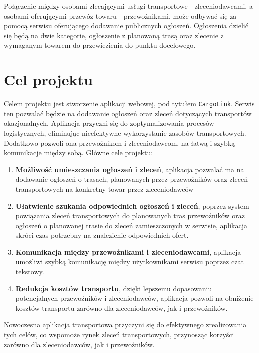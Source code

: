 Połączenie między osobami zlecającymi usługi transportowe - zleceniodawcami, a osobami oferującymi przewóz towaru - przewoźnikami, może odbywać się za pomocą serwisu oferującego dodawanie publicznych ogłoszeń. Ogłoszenia dzielić się będą na dwie kategorie, ogłoszenie z planowaną trasą oraz zlecenie z wymaganym towarem do przewiezienia do punktu docelowego.

\label{sec:cele}
\section{Cel projektu}
Celem projektu jest stworzenie aplikacji webowej, pod tytułem \texttt{CargoLink}. Serwis ten pozwalać będzie na dodawanie ogłoszeń oraz zleceń dotyczących transportów okazjonalnych. Aplikacja przyczni się do zoptymalizowania procesów logistycznych, eliminując nieefektywne wykorzystanie zasobów transportowych. Dodatkowo pozwoli ona przewoźnikom i zleceniodawcom, na łatwą i szybką komunikacje między sobą.
Główne cele projektu:
\begin{enumerate}
    \item \textbf{Możliwość umieszczania ogłoszeń i zleceń}, aplikacja pozwalać ma na dodawanie ogłoszeń o trasach, planowanych przez przewoźników oraz zleceń transportowych na konkretny towar przez zleceniodawców
    \item \textbf{Ułatwienie szukania odpowiednich ogłoszeń i zleceń}, poprzez system powiązania zleceń transportowych do planowanych tras przewoźników oraz ogłoszeń o planowanej trasie do zleceń zamieszczonych w serwisie, aplikacja skróci czas potrzebny na znalezienie odpowiednich ofert.
    \item \textbf{Komunikacja między przewoźnikami i zleceniodawcami}, aplikacja umożliwi szybką komunikację między użytkownikami serwisu poprzez czat tekstowy.
    \item \textbf{Redukcja kosztów transportu}, dzięki lepszemu dopasowaniu potencjalnych przewoźników i zleceniodawców, aplikacja pozwoli na obniżenie kosztów transportu zarówno dla zleceniodawców, jak i przewoźników.
\end{enumerate}
Nowoczesna aplikacja transportowa przyczyni się do efektywnego zrealizowania tych celów, co wspomoże rynek zleceń transportowych, przynosząc korzyści zarówno dla zleceniodawców, jak i przewoźników.

